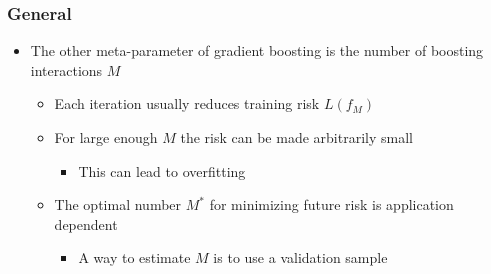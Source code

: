 \documentclass[11pt]{article}
\begin{document}
\subsubsection{General}
\label{sec:org2ec89e2}
\begin{itemize}
\item The other meta-parameter of gradient boosting is the number of boosting interactions \(M\)
\begin{itemize}
\item Each iteration usually reduces training risk \(L(f_M)\)
\item For large enough \(M\) the risk can be made arbitrarily small
\begin{itemize}
\item This can lead to overfitting
\end{itemize}
\item The optimal number \(M^*\) for minimizing future risk is application dependent
\begin{itemize}
\item A way to estimate \(M\) is to use a validation sample
\end{itemize}
\end{itemize}
\end{itemize}
\end{document}
